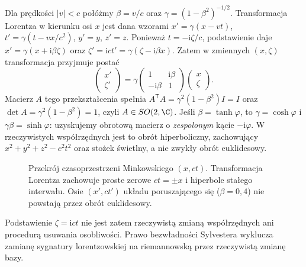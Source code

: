 \begin{przyklad}
Dla prędkości $|v|<c$ połóżmy $\beta=v/c$ oraz
$\gamma=(1-\beta^2)^{-1/2}$. Transformacja Lorentza
w kierunku osi $x$ jest dana wzorami
$x'=\gamma(x-vt)$,
$t'=\gamma(t-vx/c^2)$, $y'=y$, $z'=z$.
Ponieważ $t=-\mathrm{i}\zeta/c$, podstawienie daje
$x'=\gamma(x+\mathrm{i}\beta\zeta)$ oraz
$\zeta'=\mathrm{i}ct'
=\gamma(\zeta-\mathrm{i}\beta x)$.
Zatem w zmiennych $(x,\zeta)$ transformacja przyjmuje postać
\begin{equation}\label{eq:poincare-complex-boost}
 \begin{pmatrix}x'\\\zeta'\end{pmatrix}
 =\gamma\begin{pmatrix}
  1&\mathrm{i}\beta\\-\mathrm{i}\beta&1
 \end{pmatrix}
 \begin{pmatrix}x\\\zeta\end{pmatrix}.
\end{equation}
Macierz $A$ tego przekształcenia spełnia
$A^{\mathsf T}A=\gamma^2(1-\beta^2)I=I$ oraz
$\det A=\gamma^2(1-\beta^2)=1$, czyli $A\in SO(2,\C)$.
Jeśli $\beta=\tanh\varphi$, to
$\gamma=\cosh\varphi$ i $\gamma\beta=\sinh\varphi$:
uzyskujemy obrotową macierz o \emph{zespolonym}
kącie $-\mathrm{i}\varphi$. W rzeczywistych
współrzędnych jest to obrót hiperboliczny, zachowujący
$x^2+y^2+z^2-c^2t^2$ oraz stożek świetlny,
a nie zwykły obrót euklidesowy.

\begin{figure}[htbp]
\centering
{}
\caption{Przekrój czasoprzestrzeni Minkowskiego $(x,ct)$.
Transformacja Lorentza zachowuje proste zerowe
$ct=\pm x$ i hiperbole stałego interwału. Osie
$(x',ct')$ układu poruszającego się ($\beta=0{,}4$)
nie powstają przez obrót euklidesowy.}
\label{fig:poincare-boost}
\end{figure}

Podstawienie $\zeta=\mathrm{i}ct$ nie jest zatem
rzeczywistą zmianą współrzędnych ani procedurą
usuwania osobliwości. Prawo bezwładności Sylvestera
wyklucza zamianę sygnatury lorentzowskiej na
riemannowską przez rzeczywistą zmianę bazy.
\end{przyklad}

